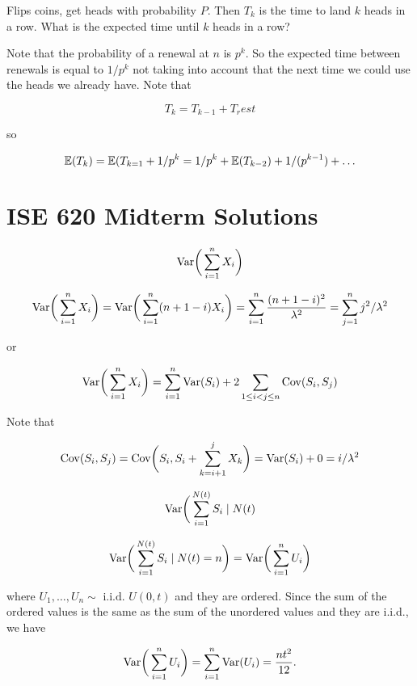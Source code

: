 \begin{example}Flips coins, get heads with probability \(P\). Then \(T_{k}\) is the time to land \(k\) heads in a row. What is the expected time until \(k\) heads in a row?

\begin{solution} Note that the probability of a renewal at \(n\) is \(p^k\). So the expected time between renewals is equal to \(1/p^k\) not taking into account that the next time we could use the heads we already have. Note that

\[
T_k = T_{k-1} + T_rest
\] 

so

\[
\mathbb{E}(T_k) = \mathbb{E}(T_{k=1} + 1/p^k = 1/p^k + \mathbb{E}(T_{k-2}) + 1/(p^{k-1}) + \ldots
\]

\end{solution}

\end{example}

\section{ISE 620 Midterm Solutions}


\begin{exercise}

\[
\mathrm{Var} \bigg( \sum_{i=1}^n X_i \bigg) 
\]

\end{exercise}
\begin{solution} 

\[
\mathrm{Var} \bigg( \sum_{i=1}^n X_i \bigg) = \mathrm{Var} \bigg( \sum_{i=1}^n (n + 1 - i) X_i \bigg) = \sum_{i=1}^n \frac{(n + 1 - i)^2}{\lambda^2} = \sum_{j=1}^n j^2/\lambda^2
\]

or

\[
\mathrm{Var} \bigg( \sum_{i=1}^n X_i \bigg) = \sum_{i=1}^n \mathrm{Var}(S_i) +2  \sum_{1 \leq i < j \leq n} \mathrm{Cov}(S_i, S_j) 
\]

Note that 

\[
 \mathrm{Cov}(S_i, S_j)  = \mathrm{Cov} \bigg(S_i, S_i + \sum_{k=i+1}^j X_k \bigg) = \mathrm{Var}(S_i) + 0 = i/\lambda^2
\]

\end{solution}

\begin{exercise}

\[
\mathrm{Var} \bigg( \sum_{i=1}^{N(t)} S_i \mid N(t) 
\]

\end{exercise}

\begin{solution} 

\[
\mathrm{Var} \bigg( \sum_{i=1}^{N(t)} S_i \mid N(t) = n \bigg) = \mathrm{Var} \bigg( \sum_{i=1}^{n} U_i \bigg) 
\]

where \(U_1, \ldots, U_n \sim \text{ i.i.d. } U(0,t)\) and they are ordered. Since the sum of the ordered values is the same as the sum of the unordered values and they are i.i.d., we have

\[
 \mathrm{Var} \bigg( \sum_{i=1}^{n} U_i \bigg)  =  \sum_{i=1}^{n} \mathrm{Var}(U_i ) =  \frac{n t^2}{12}.
 \]


\end{solution}

